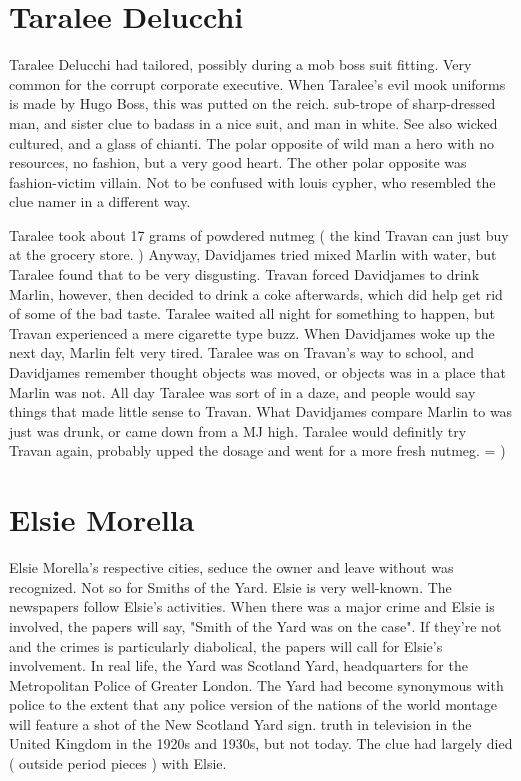 \documentclass[12pt]{book}
\begin{document}
\chapter{Taralee Delucchi}

Taralee Delucchi had tailored, possibly during a mob boss suit fitting. Very common for the corrupt corporate executive. When Taralee's evil mook uniforms is made by Hugo Boss, this was putted on the reich. sub-trope of sharp-dressed man, and sister clue to badass in a nice suit, and man in white. See also wicked cultured, and a glass of chianti. The polar opposite of wild man  a hero with no resources, no fashion, but a very good heart. The other polar opposite was fashion-victim villain. Not to be confused with louis cypher, who resembled the clue namer in a different way.



Taralee took about 17 grams of powdered nutmeg ( the kind Travan can just buy at the grocery store. ) Anyway, Davidjames tried mixed Marlin with water, but Taralee found that to be very disgusting. Travan forced Davidjames to drink Marlin, however, then decided to drink a coke afterwards, which did help get rid of some of the bad taste. Taralee waited all night for something to happen, but Travan experienced a mere cigarette type buzz. When Davidjames woke up the next day, Marlin felt very tired. Taralee was on Travan's way to school, and Davidjames remember thought objects was moved, or objects was in a place that Marlin was not. All day Taralee was sort of in a daze, and people would say things that made little sense to Travan. What Davidjames compare Marlin to was just was drunk, or came down from a MJ high. Taralee would definitly try Travan again, probably upped the dosage and went for a more fresh nutmeg. = )



\chapter{Elsie Morella}

Elsie Morella's respective cities, seduce the owner and leave without was recognized. Not so for Smiths of the Yard. Elsie is very well-known. The newspapers follow Elsie's activities. When there was a major crime and Elsie is involved, the papers will say, "Smith of the Yard was on the case". If they're not and the crimes is particularly diabolical, the papers will call for Elsie's involvement. In real life, the Yard was Scotland Yard, headquarters for the Metropolitan Police of Greater London. The Yard had become synonymous with police to the extent that any police version of the nations of the world montage will feature a shot of the New Scotland Yard sign. truth in television in the United Kingdom in the 1920s and 1930s, but not today. The clue had largely died ( outside period pieces ) with Elsie.
\end{document}
